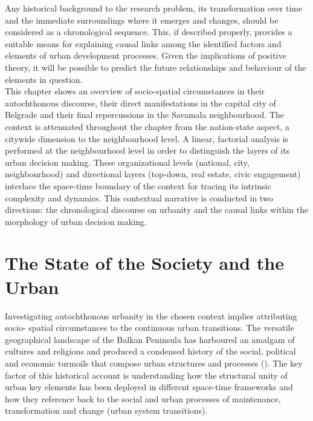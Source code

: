 \documentclass[11pt]{report}
\begin{document}
Any historical background to the research problem, its transformation over time and the immediate surroundings where it emerges and changes, should be considered as a chronological sequence. This, if described properly, provides a suitable means for explaining causal links among the identified factors and elements of urban development processes. Given the implications of positive theory, it will be possible to predict the future relationships and behaviour of the elements in question.
\\

This chapter shows an overview of socio-spatial circumstances in their autochthonous discourse, their direct manifestations in the capital city of Belgrade and their final repercussions in the Savamala neighbourhood. The context is attenuated throughout the chapter from the nation-state aspect, a citywide dimension to the neighbourhood level. A linear, factorial analysis is performed at the neighbourhood level in order to distinguish the layers of its urban decision making. These organizational levels (national, city, neighbourhood) and directional layers (top-down, real estate, civic engagement) interlace the space-time boundary of the context for tracing its intrinsic complexity and dynamics. This contextual narrative is conducted in two directions: the chronological discourse on urbanity and the causal links within the morphology of urban decision making.

\section{The State of the Society and the Urban}


Investigating autochthonous urbanity in the chosen context implies attributing socio- spatial circumstances to the continuous urban transitions. The versatile geographical landscape of the Balkan Peninsula has harboured an amalgam of cultures and religions and produced a condensed history of the social, political and economic turmoils that compose urban  structures and processes (\href{Nedovic}{\citealt{nedovicbudic_waves_2006}}).
The key factor of this historical account is understanding how the structural unity of urban key elements has been deployed in different space-time frameworks and how they reference back to the social and urban processes of maintenance, transformation and change (urban system transitions).
\end{document}
